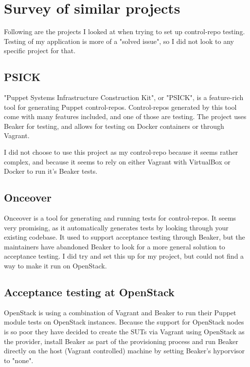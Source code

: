 \section{Survey of similar projects}

Following are the projects I looked at when trying to set up control-repo testing. Testing of my application is more of a "solved issue", so I did not look to any specific project for that.

\subsection{PSICK}

"Puppet Systems Infrastructure Construction Kit", or "PSICK", is a feature-rich tool for generating Puppet control-repos. Control-repos generated by this tool come with many features included, and one of those are testing. The project uses Beaker for testing, and allows for testing on Docker containers or through Vagrant.

I did not choose to use this project as my control-repo because it seems rather complex, and because it seems to rely on either Vagrant with VirtualBox or Docker to run it's Beaker tests.

\subsection{Onceover}

Onceover is a tool for generating and running tests for control-repos. It seems very promising, as it automatically generates tests by looking through your existing codebase. It used to support acceptance testing through Beaker, but the maintainers have abandoned Beaker to look for a more general solution to acceptance testing. I did try and set this up for my project, but could not find a way to make it run on OpenStack.

\subsection{Acceptance testing at OpenStack}

OpenStack is using a combination of Vagrant and Beaker to run their Puppet module tests on OpenStack instances. Because the support for OpenStack nodes is so poor they have decided to create the SUTs via Vagrant using OpenStack as the provider, install Beaker as part of the provisioning process and run Beaker directly on the host (Vagrant controlled) machine by setting Beaker's hyporvisor to "none".

